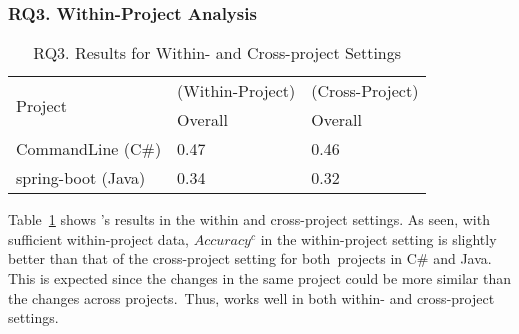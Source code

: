 \subsubsection{{\bf RQ3. Within-Project Analysis}}

\begin{table}[t]
	\caption{RQ3. Results for Within- and Cross-project Settings}
	\vspace{-12pt}
	\begin{center}
		\footnotesize
		\tabcolsep 3pt
		\renewcommand{\arraystretch}{1} \begin{tabular}{p{2cm}<{\centering}|p{2.6cm}<{\centering}|p{2.6cm}<{\centering}}
			
			\hline
			\multirow{2}{*}{Project}     & \tool (Within-Project) &\tool (Cross-Project)\\
			\cline{2-3}
			                               &         Overall  &      Overall    \\
			
			\hline
			CommandLine (C\#)   &       0.47         &		0.46	       \\
           spring-boot (Java)   &      0.34          &		0.32	       \\

			\hline
		\end{tabular}
		\label{RQ3-result}
	\end{center}
\end{table}


Table~\ref{RQ3-result} shows {\tool}'s results
in the within and cross-project settings. As seen, with sufficient
within-project data, $Accuracy^{c}$ in the within-project setting is
slightly better than that of the cross-project setting for
both~projects in C\# and Java.
This is expected since the changes in the same project could be
more similar than the changes across projects.~Thus, {\tool} works
well in both within- and cross-project settings.

